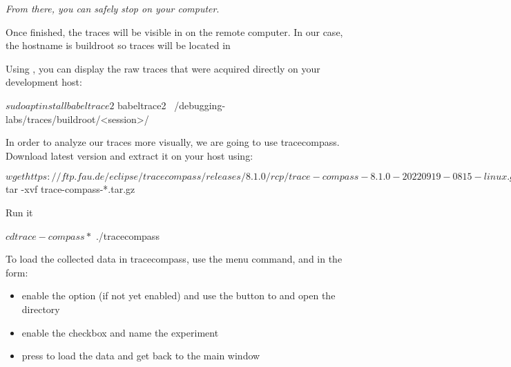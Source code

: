 
{\em From there, you can safely stop  on your computer}.

Once finished, the traces will be visible in 
on the remote computer.
In our case, the hostname is buildroot so traces will be
located in 

Using , you can display the raw traces that were acquired directly
on your development host:
\begin{bashinput}
$ sudo apt install babeltrace2
$ babeltrace2 ~/debugging-labs/traces/buildroot/<session>/
\end{bashinput}

In order to analyze our traces more visually, we are going to use tracecompass.
Download  latest version and extract it on your host using:

\begin{bashinput}
$ wget https://ftp.fau.de/eclipse/tracecompass/releases/8.1.0/rcp/trace-compass-8.1.0-20220919-0815-linux.gtk.x86_64.tar.gz
$ tar -xvf trace-compass-*.tar.gz
\end{bashinput}

Run it
\begin{bashinput}
$ cd trace-compass*
$ ./tracecompass
\end{bashinput}

To load the collected data in tracecompass, use the  menu command, and in the  form:
\begin{itemize}
  \item enable the  option (if not yet enabled)
    and use the  button to and open the
     directory
  \item enable the  checkbox and name the
    experiment 
  \item press  to load the data and get back to the main
    window
\end{itemize}

